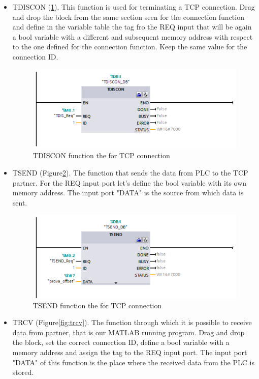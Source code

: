 \begin{itemize}
    \item TDISCON (\ref{fig:tdiscon}). This function is used for terminating a TCP connection. Drag and drop the block from the same section seen for the connection function and define in the variable table the tag fro the REQ input that will be again a bool variable with a different and subsequent memory address with respect to the one defined for the connection function. Keep the same value for the connection ID.
\begin{figure}[!h]
    \begin{center}
    \includegraphics[width=0.8\linewidth]{capitolo3/figure/tdiscon.PNG}
    \caption{TDISCON function the for TCP connection}
    \label{fig:tdiscon}
    \end{center}
\end{figure}
    
    \item TSEND (Figure\ref{fig:tsend}). The function that sends the data from PLC to the TCP partner. For the REQ input port let's define the bool variable with its own memory address. The input port "DATA" is the source from which data is sent.
    
\begin{figure}[!h]
    \begin{center}
    \includegraphics[width=0.8\linewidth]{capitolo3/figure/tsend.PNG}
    \caption{TSEND function the for TCP connection}
    \label{fig:tsend}
    \end{center}
\end{figure}
    
    \item TRCV (Figure\ref{fig:trcv}). The function through which it is possible to receive data from partner, that is our MATLAB running program. Drag and drop the block, set the correct connection ID, define a bool variable with a memory address and assign the tag to the REQ input port. The input port "DATA" of this function is the place where the received data from the PLC is stored.
    

\end{itemize}
